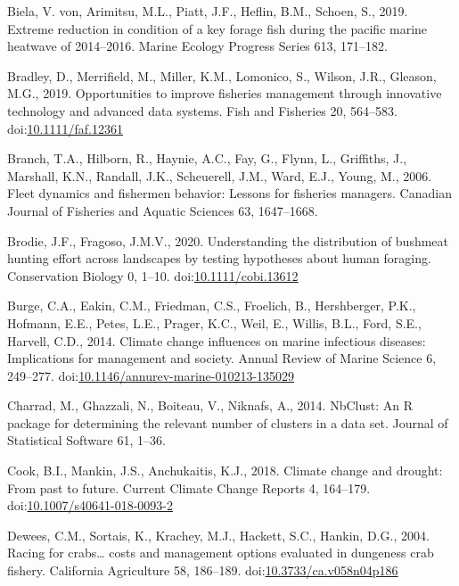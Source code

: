 \documentclass[]{elsarticle} %
\begin{document}
\leavevmode\hypertarget{ref-VonBiela2019}{}%
Biela, V. von, Arimitsu, M.L., Piatt, J.F., Heflin, B.M., Schoen, S.,
2019. Extreme reduction in condition of a key forage fish during the
pacific marine heatwave of 2014--2016. Marine Ecology Progress Series
613, 171--182.

\leavevmode\hypertarget{ref-Bradley2019}{}%
Bradley, D., Merrifield, M., Miller, K.M., Lomonico, S., Wilson, J.R.,
Gleason, M.G., 2019. Opportunities to improve fisheries management
through innovative technology and advanced data systems. Fish and
Fisheries 20, 564--583.
doi:\href{https://doi.org/10.1111/faf.12361}{10.1111/faf.12361}

\leavevmode\hypertarget{ref-Branch2006}{}%
Branch, T.A., Hilborn, R., Haynie, A.C., Fay, G., Flynn, L., Griffiths,
J., Marshall, K.N., Randall, J.K., Scheuerell, J.M., Ward, E.J., Young,
M., 2006. Fleet dynamics and fishermen behavior: Lessons for fisheries
managers. Canadian Journal of Fisheries and Aquatic Sciences 63,
1647--1668.

\leavevmode\hypertarget{ref-Brodie2020}{}%
Brodie, J.F., Fragoso, J.M.V., 2020. Understanding the distribution of
bushmeat hunting effort across landscapes by testing hypotheses about
human foraging. Conservation Biology 0, 1--10.
doi:\href{https://doi.org/10.1111/cobi.13612}{10.1111/cobi.13612}

\leavevmode\hypertarget{ref-Burge2014}{}%
Burge, C.A., Eakin, C.M., Friedman, C.S., Froelich, B., Hershberger,
P.K., Hofmann, E.E., Petes, L.E., Prager, K.C., Weil, E., Willis, B.L.,
Ford, S.E., Harvell, C.D., 2014. Climate change influences on marine
infectious diseases: Implications for management and society. Annual
Review of Marine Science 6, 249--277.
doi:\href{https://doi.org/10.1146/annurev-marine-010213-135029}{10.1146/annurev-marine-010213-135029}

\leavevmode\hypertarget{ref-nbclust2014}{}%
Charrad, M., Ghazzali, N., Boiteau, V., Niknafs, A., 2014. NbClust: An R
package for determining the relevant number of clusters in a data set.
Journal of Statistical Software 61, 1--36.

\leavevmode\hypertarget{ref-Cook2018}{}%
Cook, B.I., Mankin, J.S., Anchukaitis, K.J., 2018. Climate change and
drought: From past to future. Current Climate Change Reports 4,
164--179.
doi:\href{https://doi.org/10.1007/s40641-018-0093-2}{10.1007/s40641-018-0093-2}

\leavevmode\hypertarget{ref-Dewees2004}{}%
Dewees, C.M., Sortais, K., Krachey, M.J., Hackett, S.C., Hankin, D.G.,
2004. Racing for crabs\ldots{} costs and management options evaluated in
dungeness crab fishery. California Agriculture 58, 186--189.
doi:\href{https://doi.org/10.3733/ca.v058n04p186}{10.3733/ca.v058n04p186}
\end{document}

